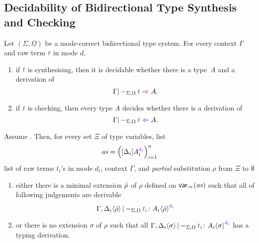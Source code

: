 \subsection{Decidability of Bidirectional Type Synthesis and Checking}


\begin{theorem} \label{thm:bidirectional-type-synthesis-checking}
  Let $(\Sigma, \Omega)$ be a mode-correct bidirectional type system.
  For every context $\Gamma$ and raw term $\isTerm{t}$ in mode $d$, 
  \begin{enumerate}
    \item if $\isTerm{t}$ is synthesising, then it is decidable whether there is a type~$A$ and a derivation of
      \[
        \Gamma |-_{\Sigma, \Omega} \isTerm{t} \syn A.
      \]
    \item if $\isTerm{t}$ is checking, then every type $A$ decides whether there is a derivation of
      \[
        \Gamma |-_{\Sigma, \Omega} \isTerm{t} \chk A.
      \]
  \end{enumerate}
\end{theorem}
\begin{lemma}\label{lem:args-induction}
  Assume .
  Then, for every set $\Xi$ of type variables, list 
  \[
    \mathit{as} = \left([\Delta_i] A_{i}^{\dir{d_i}}\right)_{i = 1}^{n}
  \]
  list of raw terms $t_i$'s in mode $d_i$, context $\Gamma$, and \emph{partial} substitution $\rho$ from $\Xi$ to $\emptyset$
  \begin{enumerate}
    \item either there is a minimal extension $\bar{\rho}$ of $\rho$ defined on $\synvar(\mathit{as})$ such that all of following judgements are derivable
      \[
        \Gamma, \simsub{\Delta_i}{\ext{\rho}} |-_{\Sigma, \Omega} \isTerm{t_i} \colon \simsub{A_i}{\ext{\rho}}^{\dir{d_i}}
      \]

    \item or there is no extension $\sigma$ of $\rho$ such that all $\Gamma, \simsub{\Delta_i}{\sigma} |-_{\Sigma, \Omega} \isTerm{t_i} \colon \simsub{A_i}{\sigma}^{\dir{d_i}}$ has a typing derivation. 
  \end{enumerate}
\end{lemma}

